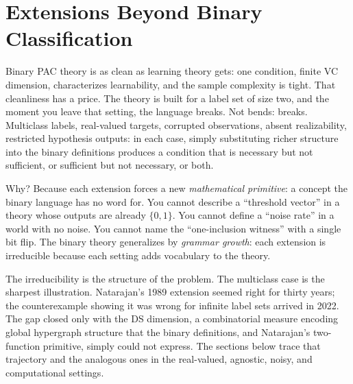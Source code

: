 
\chapter{Extensions Beyond Binary Classification}
\label{ch:extensions}

Binary PAC theory is as clean as learning theory gets: one condition, finite
VC dimension, characterizes learnability, and the sample complexity is tight.
That cleanliness has a price.  The theory is built for a label set of size two,
and the moment you leave that setting, the language breaks.  Not bends: breaks.
Multiclass labels, real-valued targets, corrupted observations, absent
realizability, restricted hypothesis outputs: in each case, simply substituting
richer structure into the binary definitions produces a condition that is
necessary but not sufficient, or sufficient but not necessary, or both.

Why?  Because each extension forces a new \emph{mathematical primitive}: a
concept the binary language has no word for.  You cannot describe a
``threshold vector'' in a theory whose outputs are already $\{0,1\}$.  You
cannot define a ``noise rate'' in a world with no noise.  You cannot name the
``one-inclusion witness'' with a single bit flip.  The binary theory generalizes
by \emph{grammar growth}: each extension is irreducible because each setting
adds vocabulary to the theory.

The irreducibility is the structure of the problem.  The multiclass case is
the sharpest illustration.  Natarajan's 1989 extension seemed right for thirty
years; the counterexample showing it was wrong for infinite label sets arrived
in 2022.  The gap closed only with the DS dimension, a combinatorial measure
encoding global hypergraph structure that the binary definitions, and
Natarajan's two-function primitive, simply could not express.  The sections
below trace that trajectory and the analogous ones in the real-valued,
agnostic, noisy, and computational settings.

\medskip

